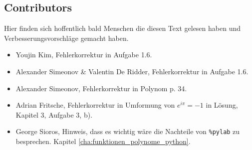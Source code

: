 \begin{multicols}{2}
\section*{Contributors}
Hier finden sich hoffentlich bald Menschen die diesen Text gelesen haben und Verbesserungsvorschläge gemacht haben.
\begin{itemize}
	\item Youjin Kim, Fehlerkorrektur in Aufgabe 1.6.
	\item Alexander Simeonov \& Valentin De Ridder, Fehlerkorrektur in Aufgabe 1.6.
	\item Alexander Simeonov, Fehlerkorrektur in Polynom p. 34.
	\item Adrian Fritsche, Fehlerkorrektur in Umformung von $e^{i\pi}=-1$ in Lösung, Kapitel 3, Aufgabe 3, b).
	\item George Sioros, Hinweis, dass es wichtig wäre die Nachteile von \texttt{\%pylab} zu besprechen. Kapitel \ref{cha:funktionen_polynome_python}.
\end{itemize}


\end{multicols}